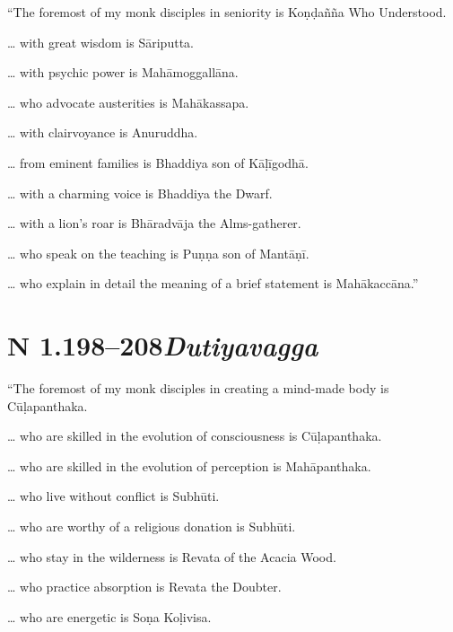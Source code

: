 \documentclass[12pt,openany]{book}%
\newcommand*{\suttatitleacronym}[1]{\smaller[2]{#1}\vspace*{.3em}}
\newcommand*{\suttatitleroot}[1]{\linebreak\smaller[2]\itshape{#1}}
\newcommand*{\tocacronym}[1]{\hspace*{-3.3em}{#1}\quad}
\newcommand*{\tocroot}[1]{(\textit{#1})}
\begin{document}
“The foremost of my monk disciples in seniority is \textsanskrit{Koṇḍañña} Who Understood. 

… with great wisdom is \textsanskrit{Sāriputta}. 

… with psychic power is \textsanskrit{Mahāmoggallāna}. 

… who advocate austerities is \textsanskrit{Mahākassapa}. 

… with clairvoyance is Anuruddha. 

… from eminent families is Bhaddiya son of \textsanskrit{Kāḷīgodhā}. 

… with a charming voice is Bhaddiya the Dwarf. 

… with a lion’s roar is \textsanskrit{Bhāradvāja} the Alms-gatherer. 

… who speak on the teaching is \textsanskrit{Puṇṇa} son of \textsanskrit{Mantāṇī}. 

… who explain in detail the meaning of a brief statement is \textsanskrit{Mahākaccāna}.” 

%
\section*{{\suttatitleacronym AN 1.198–208}{\suttatitleroot Dutiyavagga}}
\addcontentsline{toc}{section}{\tocacronym{AN 1.198–208} \tocroot{Dutiyavagga}}

“The foremost of my monk disciples in creating a mind-made body is \textsanskrit{Cūḷapanthaka}. 

… who are skilled in the evolution of consciousness is \textsanskrit{Cūḷapanthaka}. 

… who are skilled in the evolution of perception is \textsanskrit{Mahāpanthaka}. 

… who live without conflict is \textsanskrit{Subhūti}. 

… who are worthy of a religious donation is \textsanskrit{Subhūti}. 

… who stay in the wilderness is Revata of the Acacia Wood. 

… who practice absorption is Revata the Doubter. 

… who are energetic is \textsanskrit{Soṇa} \textsanskrit{Koḷivisa}. 
\end{document}
